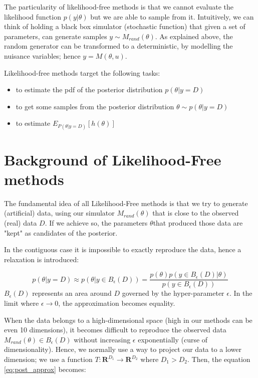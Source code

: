 \documentclass{article}
\begin{document}
The particularity of likelihood-free methods is that we cannot evaluate the likelihood function $p(y|\theta)$ but we are able to sample from it.
Intuitively, we can think of holding a black box simulator (stochastic function) that given a set of parameters,
can generate samples $y \sim M_{rand}(\theta)$.
As explained above, the random generator can be transformed to a deterministic, by modelling the nuisance variables;
hence $y=M(\theta, u)$.


Likelihood-free methods target the following tasks:

\begin{itemize}
  \item to estimate the pdf of the posterior distribution $p(\theta|y=D)$
  \item to get some samples from the posterior distribution $\theta \sim p(\theta|y=D)$
  \item to estimate $E_{P(\theta|y=D)}[h(\theta)]$
 \end{itemize}



\section{Background of Likelihood-Free methods}\label{sec:background-of-likelihood-free-methods}

The fundamental idea of all Likelihood-Free methods is that we try to generate (artificial) data,
using our simulator $M_{rand}(\theta)$ that is close to the observed (real) data $D$.
If we achieve so, the parameters $\theta$that produced those data are "kept" as candidates of the posterior.

In the contiguous case it is impossible to exactly reproduce the data, hence a relaxation is introduced:

\begin{equation} \label{eq:post_approx}
    p(\theta|y=D) \approx p(\theta|y \in B_\epsilon(D)) = \frac{p(\theta) p(y \in B_\epsilon(D)|\theta)}{p(y \in B_\epsilon(D))}
\end{equation}
%
$B_\epsilon(D)$ represents an area around $D$ governed by the hyper-parameter $\epsilon$.
In the limit where $\epsilon \rightarrow 0$, the approximation becomes equality.

When the data belongs to a high-dimensional space (high in our methods can be even 10 dimensions),
it becomes difficult to reproduce the observed data $M_{rand}(\theta) \in B_{\epsilon}(D)$ without increasing
$\epsilon$ exponentially (curse of dimensionality).
Hence, we normally use a way to project our data to a lower dimension;
we use a function $T:\mathbf{R}^{D_1} \rightarrow \mathbf{R}^{D_2}$ where $D_1 > D_2$.
Then, the equation \ref{eq:post_approx} becomes:
\end{document}
